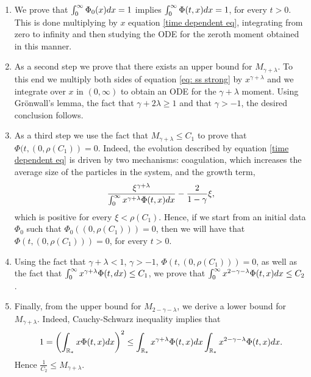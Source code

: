 \documentclass[11pt]{article}
\numberwithin{equation}{section}
\theoremstyle{plain}
\newcommand{\der}{\textup{d}}
\begin{document}
\begin{enumerate}
    \item We prove that $\int_0^\infty \Phi_0(x) \der x =1 $ implies  $\int_0^\infty \Phi(t,x) \der x =1 $, for every $t >0$. This is done multiplying by $x$ equation \eqref{time dependent eq}, integrating from zero to infinity and then studying the ODE for the zeroth moment obtained in this manner. 
    \item As a second step we prove that there exists an upper bound for $M_{\gamma + \lambda}$. 
 To this end we multiply both sides of equation \eqref{eq: ss strong} by $x^{\gamma + \lambda}$ and we integrate over $x$ in $(0, \infty)$ to obtain an ODE for the $\gamma + \lambda $ moment.
Using Gr\"onwall's lemma, the fact that $\gamma + 2 \lambda  \geq 1 $ and that $\gamma > -1$, the desired conclusion follows. 
\item As a third step we use the fact that $M_{\gamma + \lambda} \leq C_1$ to prove that $\Phi(t, (0, \rho(C_{1}))=0.$ 
Indeed, the evolution described by equation \eqref{time dependent eq} is driven by two mechanisms: coagulation, which increases the average size of the particles in the system, and the growth term,
\[
 \frac{\xi^{\gamma + \lambda }}{\int_0^\infty x^{\gamma + \lambda } \Phi(t,x ) \der x } - \frac{2}{1-\gamma} \xi,  
\] 
which is positive for every $\xi < \rho(C_1) $. 
Hence, if we start from an initial data $\Phi_0$ such that $\Phi_0((0,   \rho(C_1) ))=0$, then we will have that $\Phi(t,(0,  \rho(C_1) ))=0$, for every $t >0.$
\item Using the fact that $\gamma + \lambda <1$, $\gamma > -1$, $\Phi(t,(0,  \rho(C_1)))=0$, as well as the fact that $\int_0^\infty x^{\gamma+\lambda} \Phi(t, \der x) \leq C_1  $, we prove that $ \int_0^\infty x^{2-\gamma-\lambda} \Phi(t,x) \der x \leq C_{2}$. 
\item Finally, from the upper bound for $M_{2-\gamma -\lambda}$, we derive a lower bound for $M_{\gamma + \lambda}$. Indeed, Cauchy-Schwarz inequality implies that
\begin{align}\label{CS}
  1= \left(   \int_{\mathbb R_*} x \Phi(t, x) \der x  \right)^2\leq \int_{\mathbb R_*} x^{\gamma+\lambda} \Phi(t,  x) \der x \int_{\mathbb R_*} x^{2-\gamma - \lambda } \Phi(t, x) \der x .
\end{align}
Hence $\frac{1}{C_{2}} \leq M_{\gamma + \lambda}. $
\end{enumerate}
\end{document}
